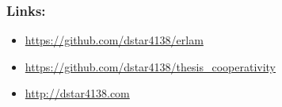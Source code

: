 \begin{frame}
    \frametitle{Links:}

    \begin{itemize}
        \item \url{https://github.com/dstar4138/erlam}
        \item \url{https://github.com/dstar4138/thesis_cooperativity}
        \item \url{http://dstar4138.com}
    \end{itemize}
\end{frame}
